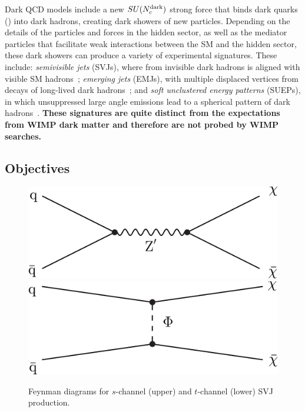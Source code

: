 Dark QCD models include a new $SU(N_{c}^{\text{dark}})$ strong force that binds dark quarks (\Pqdark) into dark hadrons, creating dark showers of new particles.
Depending on the details of the particles and forces in the hidden sector,
as well as the mediator particles that facilitate weak interactions between the SM and the hidden sector,
these dark showers can produce a variety of experimental signatures.
These include: \emph{semivisible jets} (SVJs), where \met from invisible dark hadrons is aligned with visible SM hadrons~\cite{Cohen:2015toa};
\emph{emerging jets} (EMJs), with multiple displaced vertices from decays of long-lived dark hadrons~\cite{Schwaller:2015gea};
and \emph{soft unclustered energy patterns} (SUEPs), in which unsuppressed large angle emissions lead to a spherical pattern of dark hadrons~\cite{Knapen:2016hky}.
\textbf{These signatures are quite distinct from the expectations from WIMP dark matter and therefore are not probed by WIMP searches.}

\subsection{Objectives}\label{subsec:dmobj}

\begin{figure}
\centering
\includegraphics[width=0.49\myfigurewidth]{figures/zPrime_feyn.pdf}\\
\includegraphics[width=0.49\myfigurewidth]{figures/tChan_feyn.pdf}
\caption{Feynman diagrams for $s$-channel (upper) and $t$-channel (lower) SVJ production.}
\label{fig:diagrams}
\end{figure}

